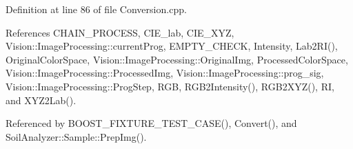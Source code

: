 Definition at line 86 of file Conversion.\+cpp.



References C\+H\+A\+I\+N\+\_\+\+P\+R\+O\+C\+E\+S\+S, C\+I\+E\+\_\+lab, C\+I\+E\+\_\+\+X\+Y\+Z, Vision\+::\+Image\+Processing\+::current\+Prog, E\+M\+P\+T\+Y\+\_\+\+C\+H\+E\+C\+K, Intensity, Lab2\+R\+I(), Original\+Color\+Space, Vision\+::\+Image\+Processing\+::\+Original\+Img, Processed\+Color\+Space, Vision\+::\+Image\+Processing\+::\+Processed\+Img, Vision\+::\+Image\+Processing\+::prog\+\_\+sig, Vision\+::\+Image\+Processing\+::\+Prog\+Step, R\+G\+B, R\+G\+B2\+Intensity(), R\+G\+B2\+X\+Y\+Z(), R\+I, and X\+Y\+Z2\+Lab().



Referenced by B\+O\+O\+S\+T\+\_\+\+F\+I\+X\+T\+U\+R\+E\+\_\+\+T\+E\+S\+T\+\_\+\+C\+A\+S\+E(), Convert(), and Soil\+Analyzer\+::\+Sample\+::\+Prep\+Img().


